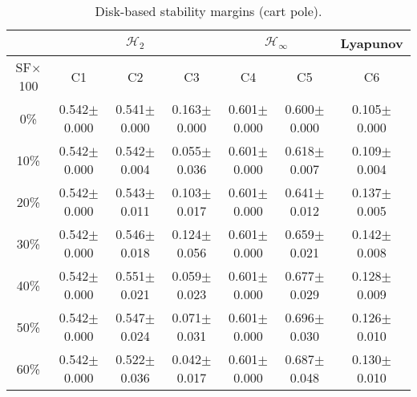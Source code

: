 \begin{table}[H]
\centering
\scriptsize
\begin{tabular}{| c || c | c | c | c | c | c |}
	\hline
	 & \multicolumn{3}{c|}{$\mathcal{H}_{2}$} & \multicolumn{2}{c|}{$\mathcal{H}_{\infty}$} & Lyapunov\\
	\hline
	SF$\times$100 & C1& C2 & C3 & C4 & C5 & C6\\
	\hline\hline
	0\% & 0.542$\pm$0.000 & 0.541$\pm$0.000 & 0.163$\pm$0.000 & 0.601$\pm$0.000 & 0.600$\pm$0.000 & 0.105$\pm$0.000\\
	\hline
	10\% & 0.542$\pm$0.000 & 0.542$\pm$0.004 & 0.055$\pm$0.036 & 0.601$\pm$0.000 & 0.618$\pm$0.007 & 0.109$\pm$0.004\\
	\hline
	20\% & 0.542$\pm$0.000 & 0.543$\pm$0.011 & 0.103$\pm$0.017 & 0.601$\pm$0.000 & 0.641$\pm$0.012 & 0.137$\pm$0.005\\
	\hline
	30\% & 0.542$\pm$0.000 & 0.546$\pm$0.018 & 0.124$\pm$0.056 & 0.601$\pm$0.000 & 0.659$\pm$0.021 & 0.142$\pm$0.008\\
	\hline
	40\% & 0.542$\pm$0.000 & 0.551$\pm$0.021 & 0.059$\pm$0.023 & 0.601$\pm$0.000 & 0.677$\pm$0.029 & 0.128$\pm$0.009\\
	\hline
	50\% & 0.542$\pm$0.000 & 0.547$\pm$0.024 & 0.071$\pm$0.031 & 0.601$\pm$0.000 & 0.696$\pm$0.030 & 0.126$\pm$0.010\\
	\hline
	60\% & 0.542$\pm$0.000 & 0.522$\pm$0.036 & 0.042$\pm$0.017 & 0.601$\pm$0.000 & 0.687$\pm$0.048 & 0.130$\pm$0.010\\
	\hline
\end{tabular}
\caption{Disk-based stability margins (cart pole).}
\label{table:disk_margins_cart_pole:noise}
\end{table}

